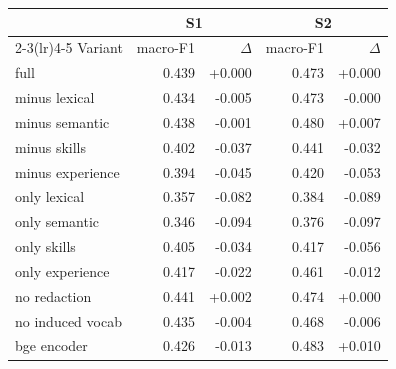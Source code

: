 \begin{tabular}{l rr rr}
\toprule
 & \multicolumn{2}{c}{S1} & \multicolumn{2}{c}{S2} \\
\cmidrule(lr){2-3}\cmidrule(lr){4-5}
Variant & macro-F1 & $\Delta$ & macro-F1 & $\Delta$ \\
\midrule
full & 0.439 & +0.000 & 0.473 & +0.000 \\
minus lexical & 0.434 & -0.005 & 0.473 & -0.000 \\
minus semantic & 0.438 & -0.001 & 0.480 & +0.007 \\
minus skills & 0.402 & -0.037 & 0.441 & -0.032 \\
minus experience & 0.394 & -0.045 & 0.420 & -0.053 \\
only lexical & 0.357 & -0.082 & 0.384 & -0.089 \\
only semantic & 0.346 & -0.094 & 0.376 & -0.097 \\
only skills & 0.405 & -0.034 & 0.417 & -0.056 \\
only experience & 0.417 & -0.022 & 0.461 & -0.012 \\
no redaction & 0.441 & +0.002 & 0.474 & +0.000 \\
no induced vocab & 0.435 & -0.004 & 0.468 & -0.006 \\
bge encoder & 0.426 & -0.013 & 0.483 & +0.010 \\
\bottomrule
\end{tabular}